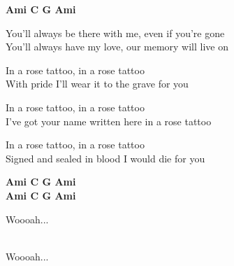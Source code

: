 \re{}\begin{footnotesize}
\textbf{Ami C G Ami}
\end{footnotesize}

\ve{}
You’ll always be there with me, even if you’re gone\\
You’ll always have my love, our memory will live on

\cho{}

\re{*:}
In a rose tattoo, in a rose tattoo\\
With pride I’ll wear it to the grave for you

In a rose tattoo, in a rose tattoo\\
I’ve got your name written here in a rose tattoo

In a rose tattoo, in a rose tattoo\\
Signed and sealed in blood I would die for you

\re{}\begin{footnotesize}
\textbf{Ami C G Ami\\
Ami C G Ami}
\end{footnotesize}

Woooah... \quad {}

\\
Woooah... \quad {}


\esong